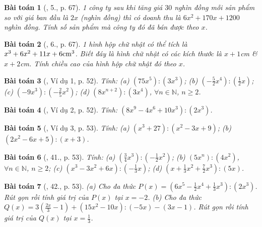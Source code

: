 \documentclass{article}
\newtheorem{baitoan}{Bài toán}
\begin{document}
\begin{baitoan}[\cite{SGK_Toan_7_Canh_Dieu_tap_2}, 5., p. 67]
	1 công ty sau khi tăng giá $30$ nghìn đồng mỗi sản phẩm so với giá ban đầu là $2x$ (nghìn đồng) thì có doanh thu là $6x^2 + 170x + 1200$ nghìn đồng. Tính số sản phẩm mà công ty đó đã bán được theo $x$.
\end{baitoan}

\begin{baitoan}[\cite{SGK_Toan_7_Canh_Dieu_tap_2}, 6., p. 67]
	1 hình hộp chữ nhật có thể tích là $x^3 + 6x^2 + 11x + 6{\rm cm}^3$. Biết đáy là hình chữ nhật có các kích thước là $x + 1$\emph{cm} \& $x + 2$\emph{cm}. Tính chiều cao của hình hộp chữ nhật đó theo $x$.
\end{baitoan}

\begin{baitoan}[\cite{SBT_Toan_7_Canh_Dieu_tap_2}, Ví dụ 1, p. 52]
	Tính: (a) $(75x^5):(3x^3)$; (b) $\left(-\frac{5}{2}x^4\right):\left(\frac{1}{2}x\right)$; (c) $(-9x^3):\left(-\frac{2}{5}x^2\right)$; (d) $(8x^{n+2}):(3x^4)$, $\forall n\in\mathbb{N}$, $n\ge2$.
\end{baitoan}

\begin{baitoan}[\cite{SBT_Toan_7_Canh_Dieu_tap_2}, Ví dụ 2, p. 52]
	Tính: $(8x^9 - 4x^6 + 10x^3):(2x^3)$.
\end{baitoan}

\begin{baitoan}[\cite{SBT_Toan_7_Canh_Dieu_tap_2}, Ví dụ 3, p. 53]
	Tính: (a) $(x^3 + 27):(x^2 - 3x + 9)$; (b) $(2x^2 - 6x + 5):(x + 3)$.
\end{baitoan}

\begin{baitoan}[\cite{SBT_Toan_7_Canh_Dieu_tap_2}, 41., p. 53]
	Tính: (a) $\left(\frac{3}{4}x^3\right):\left(-\frac{1}{2}x^2\right)$; (b) $(5x^n):(4x^2)$, $\forall n\in\mathbb{N}$, $n\ge2$; (c) $(x^3 - 3x^2 + 6x):\left(-\frac{1}{3}x\right)$; (d) $\left(x + \frac{1}{3}x^2 + \frac{7}{2}x^3\right):(5x)$.
\end{baitoan}

\begin{baitoan}[\cite{SBT_Toan_7_Canh_Dieu_tap_2}, 42., p. 53]
	(a) Cho đa thức $P(x) = \left(6x^5 - \frac{1}{2}x^4 + \frac{1}{3}x^3\right):(2x^3)$. Rút gọn rồi tính giá trị của $P(x)$ tại $x = -2$. (b) Cho đa thức $Q(x) = 3\left(\frac{2x}{3} - 1\right) + (15x^2 - 10x):(-5x) - (3x - 1)$. Rút gọn rồi tính giá trị của $Q(x)$ tại $x = \frac{1}{3}$.
\end{baitoan}
\end{document}
